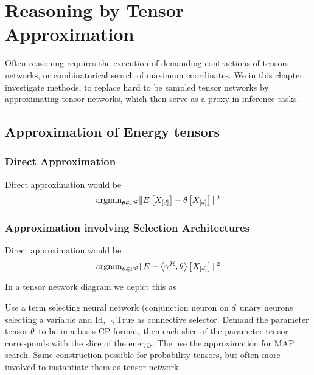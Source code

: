 \section{Reasoning by Tensor Approximation}\label{cha:tensorApproximation}

Often reasoning requires the execution of demanding contractions of tensors networks, or combinatorical search of maximum coordinates.
We in this chapter investigate methods, to replace hard to be sampled tensor networks by approximating tensor networks, which then serve as a proxy in inference tasks.


\subsection{Approximation of Energy tensors}




\subsubsection{Direct Approximation}

Direct approximation would be
	\[ \mathrm{argmin}_{\theta\in\Gamma^{\mathcal{G}}} \|E\left[X_{[d]}\right] - \theta\left[X_{[d]}\right]\|^2 \]


\subsubsection{Approximation involving Selection Architectures}

Direct approximation would be
	\[ \mathrm{argmin}_{\theta\in\Gamma^{\mathcal{G}}} \|E - \left\langle \gamma^{\mathcal{H}},\theta\right\rangle \left[ X_{[d]} \right]\|^2 \]

In a tensor network diagram we depict this as
\begin{center}
    
\end{center}


\begin{example}
	Use a term selecting neural network (conjunction neuron on $d$ unary neurons selecting a variable and $\mathrm{Id},\lnot,\mathrm{True}$ as connective selector.
	Demand the parameter tensor $\theta$ to be in a basis CP format, then each slice of the parameter tensor corresponds with the slice of the energy.
	The use the approximation for MAP search.
	Same construction possible for probability tensors, but often more involved to instantiate them as tensor network.
\end{example}


